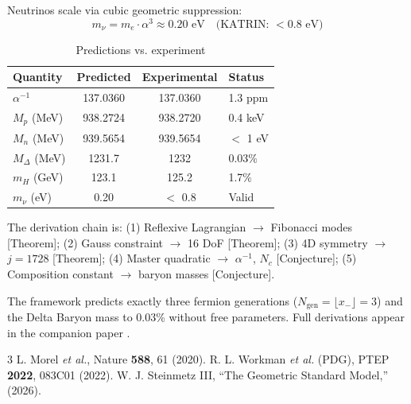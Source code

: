 \documentclass[aps,prl,twocolumn,10pt,groupedaddress,nopacs]{revtex4}
\begin{document}
Neutrinos scale via cubic geometric suppression:
\begin{equation}
m_\nu = m_e \cdot \alpha^3 \approx 0.20 \text{ eV} \quad \text{(KATRIN: } < 0.8 \text{ eV)}
\end{equation}

\begin{table}[h]
\caption{Predictions vs. experiment}
\begin{ruledtabular}
\begin{tabular}{lccl}
Quantity & Predicted & Experimental & Status \\
\hline
$\alpha^{-1}$ & 137.0360 & 137.0360 & 1.3 ppm \\
$M_p$ (MeV) & 938.2724 & 938.2720 & 0.4 keV \\
$M_n$ (MeV) & 939.5654 & 939.5654 & $<$ 1 eV \\
$M_\Delta$ (MeV) & 1231.7 & 1232 & 0.03\% \\
$m_H$ (GeV) & 123.1 & 125.2 & 1.7\% \\
$m_\nu$ (eV) & 0.20 & $<$ 0.8 & Valid \\
\end{tabular}
\end{ruledtabular}
\end{table}

The derivation chain is: (1) Reflexive Lagrangian $\to$ Fibonacci modes [Theorem]; (2) Gauss constraint $\to$ 16 DoF [Theorem]; (3) 4D symmetry $\to$ $j=1728$ [Theorem]; (4) Master quadratic $\to$ $\alpha^{-1}$, $N_c$ [Conjecture]; (5) Composition constant $\to$ baryon masses [Conjecture].

The framework predicts exactly three fermion generations ($N_{\text{gen}} = \lfloor x_- \rfloor = 3$) and the Delta Baryon mass to 0.03\% without free parameters. Full derivations appear in the companion paper \cite{GSM2025}.

\begin{thebibliography}{3}
 L. Morel \textit{et al.}, Nature \textbf{588}, 61 (2020).
 R. L. Workman \textit{et al.} (PDG), PTEP \textbf{2022}, 083C01 (2022).
 W. J. Steinmetz III, ``The Geometric Standard Model,'' (2026).
\end{thebibliography}
\end{document}
